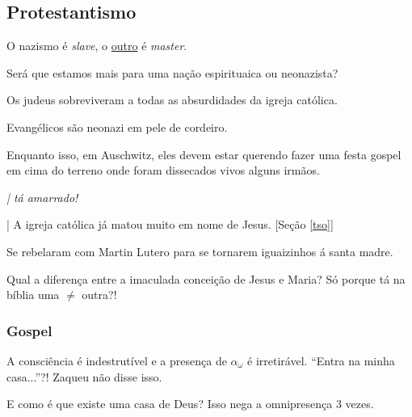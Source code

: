 \documentclass[12pt,a4paper]{article}
\begin{document}
		\subsection{Protestantismo}
			\begin{flushright}
			\end{flushright}

			O nazismo \'e \emph{slave}, o \href{http://en.wikipedia.org/wiki/Religion\_in\_Nazi\_Germany\#Protestantism}{outro} \'e \emph{master}.

Ser\'a que estamos mais para uma na\c{c}\~ao espirituaica ou neonazista?

Os judeus sobreviveram a todas as absurdidades da igreja cat\'olica.

Evang\'elicos s\~ao neonazi em pele de cordeiro.

Enquanto isso, em Auschwitz, eles devem estar querendo fazer uma festa
gospel em cima do terreno onde foram dissecados vivos alguns irm\~aos.

			\begin{flushright}
			\end{flushright}

			\emph{| t\'a amarrado!}

			| A igreja cat\'olica  j\'a matou muito em nome de Jesus. [Se\c{c}\~ao \ref{tso}]

			\begin{flushright}
			\end{flushright}

			Se rebelaram com Martin Lutero para se tornarem iguaizinhos \'a santa madre.

			Qual a diferen\c{c}a entre a imaculada concei\c{c}\~ao de Jesus e Maria? S\'o porque t\'a na b\'iblia uma $\neq$ outra?!

			\subsubsection{Gospel}

			\begin{flushright}
			\end{flushright}

			A consci\^encia\cite{x} \'e indestrut\'ivel e a presen\c{c}a de $ \alpha_\omega $ \'e irretir\'avel. \textquotedblleft Entra na minha casa...\textquotedblright ?! Zaqueu n\~ao disse isso.

			E como \'e que existe uma casa de Deus? Isso nega a omnipresen\c{c}a 3 vezes.
\end{document}
